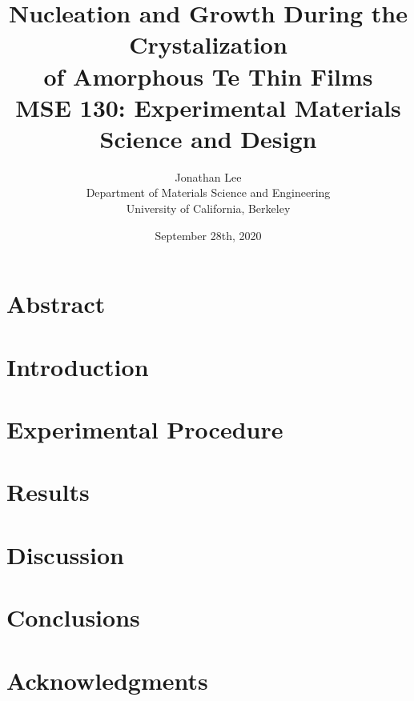 \documentclass[12pt, titlepage]{article}
\title{\Large Nucleation and Growth During the Crystalization \\
		of Amorphous Te Thin Films \\
		\bigskip
	\normalsize MSE 130: Experimental Materials Science and Design}
\author{\normalsize Jonathan Lee \\
	\normalsize Department of Materials Science and Engineering \\
	\normalsize University of California, Berkeley}
\date{\normalsize September 28th, 2020}
\begin{document}
\maketitle

\doublespacing

\setcounter{page}{2}

\tableofcontents

\newpage

\section{Abstract}

\section{Introduction}
\section{Experimental Procedure}
\section{Results}
\section{Discussion}
\section{Conclusions}
\section{Acknowledgments}

\printbibliography[heading=bibnumbered]
\end{document}
